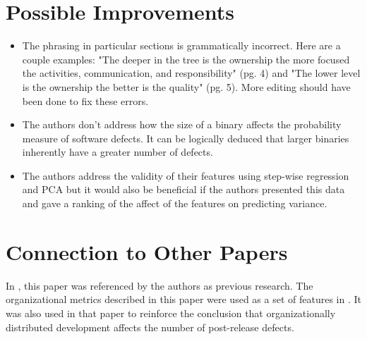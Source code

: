 \documentclass[english]{article}
\begin{document}
\section*{Possible Improvements}
\begin{itemize}
\item The phrasing in particular sections is grammatically incorrect. Here are a couple examples: "The deeper in the tree is the ownership the more focused the activities, communication, and responsibility" (pg. 4) and "The lower level is the ownership the better is the quality" (pg. 5). More editing should have been done to fix these errors.
\item The authors don't address how the size of a binary affects the probability measure of software defects. It can be logically deduced that larger binaries inherently have a greater number of defects.
\item The authors address the validity of their features using step-wise regression and PCA but it would also be beneficial if the authors presented this data and gave a ranking of the affect of the features on predicting variance.
\end{itemize}

\section*{Connection to Other Papers}

In \cite{bird09}, this paper was referenced by the authors as previous research.  The organizational metrics described in this paper were used as a set of features in \cite{bird09}. It was also used in that paper to reinforce the conclusion that organizationally distributed development affects the number of post-release defects.



\end{document}
